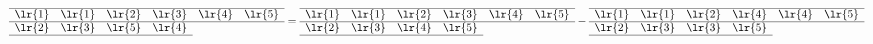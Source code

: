 \[
\begin{array}[c]{*{6}c}\cline{1-6}
\lr{1}&\lr{1}&\lr{2}&\lr{3}&\lr{4}&\lr{5}\\\cline{1-6}
\lr{2}&\lr{3}&\lr{5}&\lr{4}\\\cline{1-4}
\end{array}
=
\begin{array}[c]{*{6}c}\cline{1-6}
\lr{1}&\lr{1}&\lr{2}&\lr{3}&\lr{4}&\lr{5}\\\cline{1-6}
\lr{2}&\lr{3}&\lr{4}&\lr{5}\\\cline{1-4}
\end{array}
-\begin{array}[c]{*{6}c}\cline{1-6}
\lr{1}&\lr{1}&\lr{2}&\lr{4}&\lr{4}&\lr{5}\\\cline{1-6}
\lr{2}&\lr{3}&\lr{3}&\lr{5}\\\cline{1-4}
\end{array}
\]
